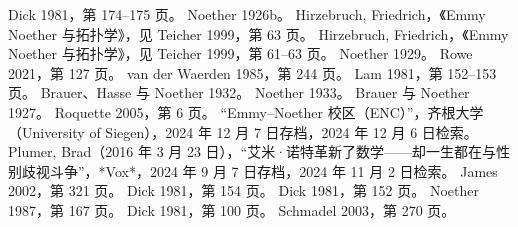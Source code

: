 \begin{enumerate}
Dick 1981，第 174–175 页。
Noether 1926b。
Hirzebruch, Friedrich，《Emmy Noether 与拓扑学》，见 Teicher 1999，第 63 页。
Hirzebruch, Friedrich，《Emmy Noether 与拓扑学》，见 Teicher 1999，第 61–63 页。
Noether 1929。
Rowe 2021，第 127 页。
van der Waerden 1985，第 244 页。
Lam 1981，第 152–153 页。
Brauer、Hasse 与 Noether 1932。
Noether 1933。
Brauer 与 Noether 1927。
Roquette 2005，第 6 页。
“Emmy–Noether 校区（ENC）”，齐根大学（University of Siegen），2024 年 12 月 7 日存档，2024 年 12 月 6 日检索。
Plumer, Brad（2016 年 3 月 23 日），“艾米·诺特革新了数学——却一生都在与性别歧视斗争”，*Vox*，2024 年 9 月 7 日存档，2024 年 11 月 2 日检索。
James 2002，第 321 页。
Dick 1981，第 154 页。
Dick 1981，第 152 页。
Noether 1987，第 167 页。
Dick 1981，第 100 页。
Schmadel 2003，第 270 页。

\end{enumerate}